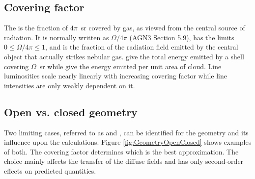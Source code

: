 \subsection{Covering factor}

The  is the fraction of $4\pi$~sr
covered by gas, as viewed
from the central source of radiation.
It is normally written as $\Omega/4\pi$ (AGN3 Section 5.9),
has the limits $0\le\Omega /4\pi\le 1$,
and is the fraction of the
radiation field emitted by the central object
that actually strikes nebular gas.
 give the total energy emitted by
a shell covering
$\Omega$~sr while  give
the energy emitted per unit area of cloud.
Line luminosities scale nearly linearly with increasing covering factor
while line intensities are only weakly dependent on it.

\subsection{Open vs. closed geometry}
\label{sec:GeometryOpenClosed}

Two limiting cases, referred to as  and , can be identified
for the geometry and its influence upon the calculations.
Figure \ref{fig:GeometryOpenClosed} shows
examples of both.
The covering factor determines which is the best
approximation.
The choice mainly affects the transfer of the diffuse fields
and has only second-order effects on predicted quantities.

